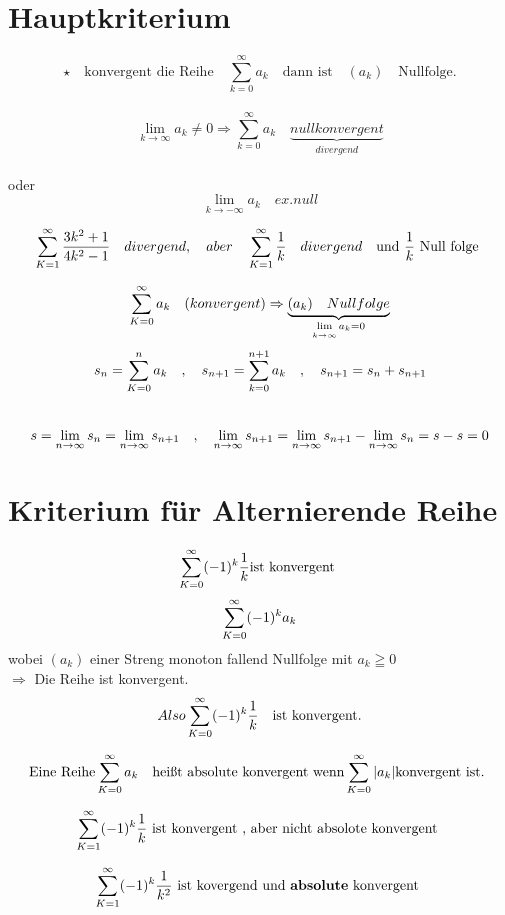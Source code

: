 \section{Hauptkriterium}
$$ \star \quad \text{konvergent die Reihe} \quad \sum_{k=0}^{\infty}{a_k} \quad \text{dann ist} \quad (a_k) \quad\text{Nullfolge.}$$ \\
$$\lim\limits_{k \rightarrow \infty}{a_k} \neq 0 \Rightarrow  \sum_{k=0}^{\infty}{a_k} \quad \underbrace{null konvergent }_{divergend}$$\\
oder
			$$\lim\limits_{k \rightarrow -\infty}{ a_k} \quad ex.null$$

						\begin{example}
						
						\[ \sum_{K=1}^{\infty} \frac{3k^2+1}{4k^2-1} \quad divergend, \quad aber \quad \sum_{K=1}^{\infty} \frac{1}{k} \quad divergend \quad \text{und $\frac{1}{k}$ Null folge }  \]
						

						\end{example}
\begin{beweis}
\[  \sum_{K=0}^{\infty} a_k \quad (konvergent) \Rightarrow \underbrace{(a_k) \quad Nullfolge }_{\lim\limits_{k \rightarrow \infty} a_k=0}  \] 
\[s_n =\sum_{K=0}^{n} a_k \quad ,\quad s_{n+1} =\sum_{k=0}^{n+1}{a_k} \quad ,\quad s_{n+1}= s_n + s_{n+1} \] \\
\[ s = \lim\limits_{n \rightarrow \infty} s_n= \lim\limits_{n \rightarrow \infty} s_{n+1}  \quad ,\quad \lim\limits_{n \rightarrow \infty} s_{n+1} = \lim\limits_{n \rightarrow \infty} s_{n+1} - \lim\limits_{n \rightarrow \infty} s_n = s-s=0 \]
\end{beweis}

\newpage
\section{Kriterium für Alternierende  Reihe}
\begin{beweis}
	$$\sum_{K=0}^{\infty} (-1)^k \frac{1}{k} \text{ist konvergent }$$
	$$ \sum_{K=0}^{\infty} (-1)^k a_k $$
	wobei $(a_k)$ einer Streng monoton fallend Nullfolge mit $a_k \geqq 0 $ \\
	$\Rightarrow$ Die Reihe ist konvergent. $$ Also \sum_{K=0}^{\infty} (-1)^k \frac{1}{k} \quad \text{ist konvergent.} $$ 

\end{beweis}
\begin{definition}
	
$$ \text{Eine Reihe}  \sum_{K=0}^{\infty}  a_k \quad \text{heißt absolute konvergent wenn} \sum_{K=0}^{\infty} |a_k| \text{konvergent ist.
	}$$
\end{definition}
\begin{example}

\[	\sum_{K=1}^{\infty} (-1)^k \frac{1}{k} \text{ ist konvergent , aber nicht absolote konvergent } \]

\[ \sum_{K=1}^{\infty} (-1)^k \frac{1}{k^2}  \text{ ist kovergend und \textbf{absolute} konvergent } \]
\end{example}


